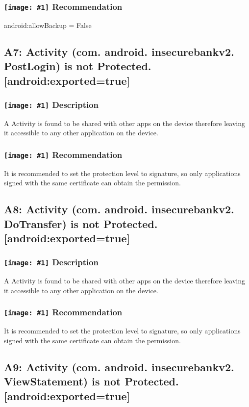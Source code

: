 \documentclass[12p]{article}
\newcommand{\icon}[1]{\texttt{[image: \#1]}}
\begin{document}
\subsubsection*{\protect\icon{/home/miki/Documents/GITHUB/AndroidPermissions/python/vulns/report_icons/basic_todo.png} Recommendation}
android:allowBackup = False
\subsection{A7: Activity (com. android. insecurebankv2. PostLogin) is not Protected. [android:exported=true]}
\subsubsection*{\protect\icon{/home/miki/Documents/GITHUB/AndroidPermissions/python/vulns/report_icons/basic_sheet.png} Description}
A Activity is found to be shared with other apps on the device therefore leaving it accessible to any other application on the device.
\subsubsection*{\protect\icon{/home/miki/Documents/GITHUB/AndroidPermissions/python/vulns/report_icons/basic_todo.png} Recommendation}
It is recommended to set the protection level to signature, so only applications signed with the same certificate can obtain the permission.
\subsection{A8: Activity (com. android. insecurebankv2. DoTransfer) is not Protected. [android:exported=true]}
\subsubsection*{\protect\icon{/home/miki/Documents/GITHUB/AndroidPermissions/python/vulns/report_icons/basic_sheet.png} Description}
A Activity is found to be shared with other apps on the device therefore leaving it accessible to any other application on the device.
\subsubsection*{\protect\icon{/home/miki/Documents/GITHUB/AndroidPermissions/python/vulns/report_icons/basic_todo.png} Recommendation}
It is recommended to set the protection level to signature, so only applications signed with the same certificate can obtain the permission.
\subsection{A9: Activity (com. android. insecurebankv2. ViewStatement) is not Protected. [android:exported=true]}
\end{document}
